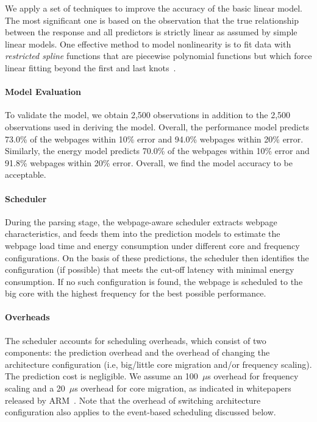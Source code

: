We apply a set of techniques to improve the accuracy of the basic linear model. The most significant one is based on the observation that the true relationship between the response and all predictors is strictly linear as assumed by simple linear models.  One effective method to model nonlinearity is to fit data with \textit{restricted spline} functions that are piecewise polynomial functions but which force linear fitting beyond the first and last knots~\cite{ESL}.
 
\paragraph{Model Evaluation} To validate the model, we obtain 2,500 observations in addition to the 2,500 observations used in deriving the model. Overall, the performance model predicts 73.0\% of the webpages within 10\% error and 94.0\% webpages within 20\% error. Similarly, the energy model predicts 70.0\% of the webpages within 10\% error and 91.8\% webpages within 20\% error. Overall, we find the model accuracy to be acceptable.

\paragraph{Scheduler} During the parsing stage, the webpage-aware scheduler extracts webpage characteristics, and feeds them into the prediction models to estimate the webpage load time and energy consumption under different core and frequency configurations.  On the basis of these predictions, the scheduler then identifies the configuration (if possible) that meets the cut-off latency with minimal energy consumption. If no such configuration is found, the webpage is scheduled to the big core with the highest frequency for the best possible performance.

\paragraph{Overheads} The scheduler accounts for scheduling overheads, which consist of two components: the prediction overhead and the overhead of changing the architecture configuration (i.e, big/little core migration and/or frequency scaling). The prediction cost is negligible. We assume an 100~$\mu$s overhead for frequency scaling and a 20~$\mu$s overhead for core migration, as indicated in whitepapers released by ARM~\cite{arm-bl-sw-wp,arm-bl-wp}. Note that the overhead of switching architecture configuration also applies to the event-based scheduling discussed below.

